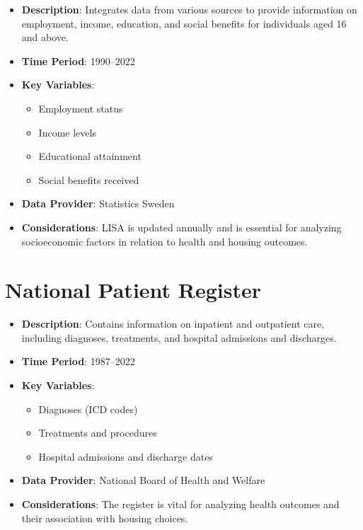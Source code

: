 \documentclass[
]{book}
\providecommand{\tightlist}{%
  \setlength{\itemsep}{0pt}\setlength{\parskip}{0pt}}
\begin{document}
\begin{itemize}
\tightlist
\item
  \textbf{Description}: Integrates data from various sources to provide information on employment, income, education, and social benefits for individuals aged 16 and above.
\item
  \textbf{Time Period}: 1990--2022
\item
  \textbf{Key Variables}:

  \begin{itemize}
  \tightlist
  \item
    Employment status
  \item
    Income levels
  \item
    Educational attainment
  \item
    Social benefits received
  \end{itemize}
\item
  \textbf{Data Provider}: Statistics Sweden
\item
  \textbf{Considerations}: LISA is updated annually and is essential for analyzing socioeconomic factors in relation to health and housing outcomes.
\end{itemize}

\hypertarget{national-patient-register}{%
\section{National Patient Register}\label{national-patient-register}}

\begin{itemize}
\tightlist
\item
  \textbf{Description}: Contains information on inpatient and outpatient care, including diagnoses, treatments, and hospital admissions and discharges.
\item
  \textbf{Time Period}: 1987--2022
\item
  \textbf{Key Variables}:

  \begin{itemize}
  \tightlist
  \item
    Diagnoses (ICD codes)
  \item
    Treatments and procedures
  \item
    Hospital admissions and discharge dates
  \end{itemize}
\item
  \textbf{Data Provider}: National Board of Health and Welfare
\item
  \textbf{Considerations}: The register is vital for analyzing health outcomes and their association with housing choices.
\end{itemize}
\end{document}
